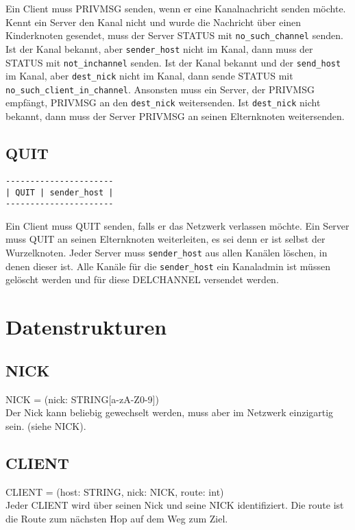 \documentclass{article}
\begin{document}
Ein Client muss PRIVMSG senden, wenn er eine Kanalnachricht senden möchte.
Kennt ein Server den Kanal nicht und wurde die Nachricht über einen Kinderknoten gesendet, muss der Server STATUS mit \lstinline{no_such_channel} senden.
Ist der Kanal bekannt, aber \lstinline{sender_host} nicht im Kanal, dann muss der STATUS mit \lstinline{not_inchannel} senden.
Ist der Kanal bekannt und der \lstinline{send_host} im Kanal, aber \lstinline{dest_nick} nicht im Kanal, dann sende STATUS mit \lstinline{no_such_client_in_channel}.
Ansonsten muss ein Server, der PRIVMSG empfängt, PRIVMSG an den \lstinline{dest_nick} weitersenden.
Ist \lstinline{dest_nick} nicht bekannt, dann muss der Server PRIVMSG an seinen Elternknoten weitersenden.

\subsection{QUIT}

\begin{lstlisting}
----------------------
| QUIT | sender_host |
----------------------
\end{lstlisting}

Ein Client muss QUIT senden, falls er das Netzwerk verlassen möchte.
Ein Server muss QUIT an seinen Elternknoten weiterleiten, es sei denn er ist selbst der Wurzelknoten.
Jeder Server muss \lstinline{sender_host} aus allen Kanälen löschen, in denen dieser ist.
Alle Kanäle für die \lstinline{sender_host} ein Kanaladmin ist müssen gelöscht werden und für diese DELCHANNEL versendet werden.

\section{Datenstrukturen}

\subsection{NICK}

NICK = (nick: STRING[a-zA-Z0-9])\\
Der Nick kann beliebig gewechselt werden, muss aber im Netzwerk einzigartig sein. (siehe NICK).

\subsection{CLIENT}

CLIENT = (host: STRING, nick: NICK, route: int)\\
Jeder CLIENT wird über seinen Nick und seine NICK identifiziert. Die route ist die Route zum nächsten Hop auf dem Weg zum Ziel.
\end{document}

